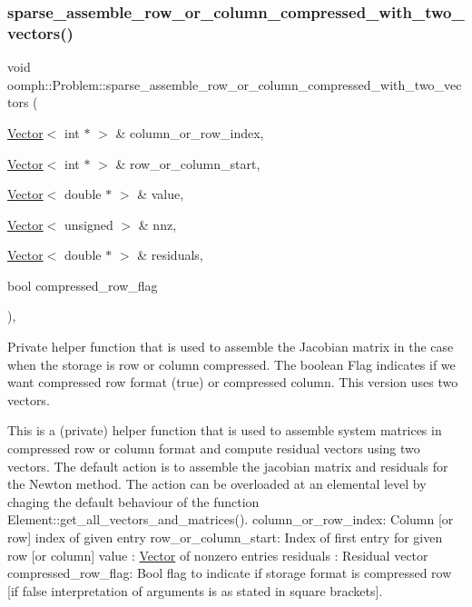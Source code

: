 \subsubsection{\texorpdfstring{sparse\+\_\+assemble\+\_\+row\+\_\+or\+\_\+column\+\_\+compressed\+\_\+with\+\_\+two\+\_\+vectors()}{sparse\_assemble\_row\_or\_column\_compressed\_with\_two\_vectors()}}
{\footnotesize\ttfamily void oomph\+::\+Problem\+::sparse\+\_\+assemble\+\_\+row\+\_\+or\+\_\+column\+\_\+compressed\+\_\+with\+\_\+two\+\_\+vectors (\begin{DoxyParamCaption}\item[{\hyperlink{classoomph_1_1Vector}{Vector}$<$ int $\ast$ $>$ \&}]{column\+\_\+or\+\_\+row\+\_\+index,  }\item[{\hyperlink{classoomph_1_1Vector}{Vector}$<$ int $\ast$ $>$ \&}]{row\+\_\+or\+\_\+column\+\_\+start,  }\item[{\hyperlink{classoomph_1_1Vector}{Vector}$<$ double $\ast$ $>$ \&}]{value,  }\item[{\hyperlink{classoomph_1_1Vector}{Vector}$<$ unsigned $>$ \&}]{nnz,  }\item[{\hyperlink{classoomph_1_1Vector}{Vector}$<$ double $\ast$ $>$ \&}]{residuals,  }\item[{bool}]{compressed\+\_\+row\+\_\+flag }\end{DoxyParamCaption})\hspace{0.3cm}{\ttfamily [private]}, {\ttfamily [virtual]}}



Private helper function that is used to assemble the Jacobian matrix in the case when the storage is row or column compressed. The boolean Flag indicates if we want compressed row format (true) or compressed column. This version uses two vectors. 

This is a (private) helper function that is used to assemble system matrices in compressed row or column format and compute residual vectors using two vectors. The default action is to assemble the jacobian matrix and residuals for the Newton method. The action can be overloaded at an elemental level by chaging the default behaviour of the function Element\+::get\+\_\+all\+\_\+vectors\+\_\+and\+\_\+matrices(). column\+\_\+or\+\_\+row\+\_\+index\+: Column \mbox{[}or row\mbox{]} index of given entry row\+\_\+or\+\_\+column\+\_\+start\+: Index of first entry for given row \mbox{[}or column\mbox{]} value \+: \hyperlink{classoomph_1_1Vector}{Vector} of nonzero entries residuals \+: Residual vector compressed\+\_\+row\+\_\+flag\+: Bool flag to indicate if storage format is compressed row \mbox{[}if false interpretation of arguments is as stated in square brackets\mbox{]}. 

